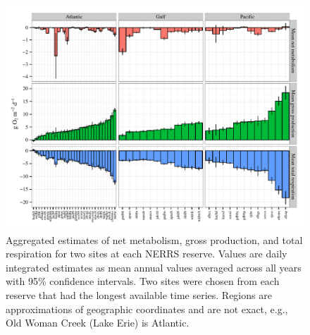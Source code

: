 \documentclass[10pt,letterpaper]{article}\usepackage[]{graphicx}\usepackage[]{color}
\newenvironment{knitrout}{}{} %
\begin{document}
\begin{knitrout}
\color{fgcolor}\begin{figure}[!ht]


{\centering \includegraphics[width=\textwidth]{figure/metab_plo} 

}

\caption[Aggregated estimates of net metabolism, gross production, and total respiration for two sites at each \ac{NERRS} reserve]{Aggregated estimates of net metabolism, gross production, and total respiration for two sites at each \ac{NERRS} reserve.  Values are daily integrated estimates as mean annual values averaged across all years with 95\% confidence intervals.  Two sites were chosen from each reserve that had the longest available time series. Regions are approximations of geographic coordinates and are not exact, e.g., Old Woman Creek (Lake Erie) is Atlantic.\label{fig:metab_plo}}
\end{figure}


\end{knitrout}
\end{document}
